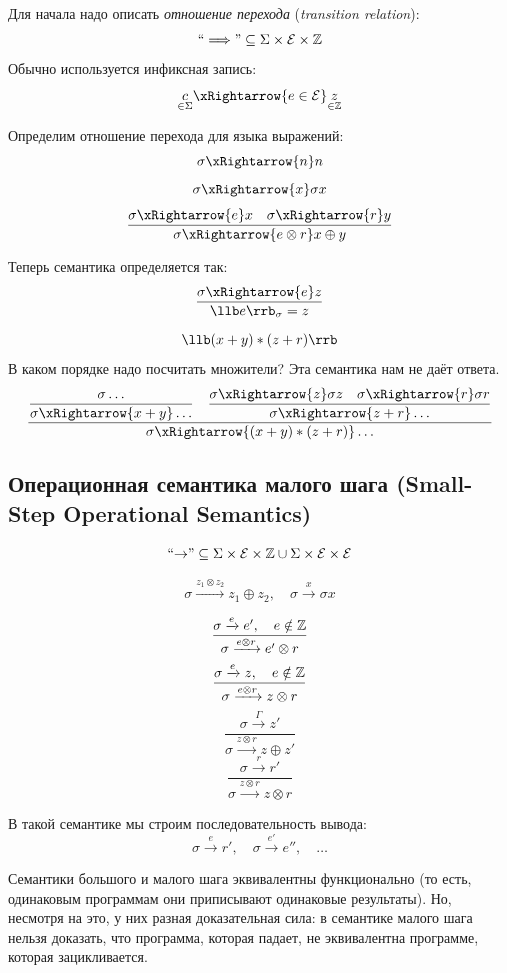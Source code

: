 Для начала надо описать \emph{отношение перехода} (\emph{transition relation}):
$$ \text{``$ \implies $''} \subseteq \Sigma \times \mathcal E \times \mathbb{Z} $$
Обычно используется инфиксная запись:
$$ \underset{\in \Sigma}c \xRightarrow{e \in \mathcal E} \underset{\in \Z}z $$

Определим отношение перехода для языка выражений:
$$ \sigma \xRightarrow{n} n $$
$$ \sigma \xRightarrow{x} \sigma x $$
$$ \frac{\sigma \xRightarrow{e} x \quad \sigma \xRightarrow{r} y}
{\sigma \xRightarrow{e \otimes r} x \oplus y} $$

Теперь семантика определяется так:
$$ \frac{\sigma \xRightarrow{e} z}{\llb e \rrb_\sigma = z} $$

$$ \llb (x + y) * (z + r) \rrb $$
В каком порядке надо посчитать множители?
Эта семантика нам не даёт ответа.
$$ \frac{\dfrac{\sigma \dots}{\sigma \xRightarrow{x + y} \dots} \quad
\dfrac{\sigma \xRightarrow{z} \sigma z \quad \sigma \xRightarrow{r} \sigma r}
{\sigma \xRightarrow{z + r} \dots}}
{\sigma \xRightarrow{(x + y) * (z + r)} \dots} $$

\subsection{Операционная семантика малого шага
(\texorpdfstring{\textenglish{Small-Step Operational Semantics}}{Small-Step Operational Semantics})}

$$ \text{``$ \to $''} \subseteq \Sigma \times \mathcal E \times \mathbb{Z} \cup
\Sigma \times \mathcal E \times \mathcal E $$

$$ \sigma \xrightarrow{z_1 \otimes z_2} z_1 \oplus z_2, \quad \sigma \xrightarrow{x} \sigma x $$

$$ \frac{\sigma \xrightarrow{e} e', \quad e \notin \mathbb{Z}}{\sigma \xrightarrow{e \otimes r}{e' \otimes r}} $$
$$ \frac{\sigma \xrightarrow{e} z, \quad e \notin \mathbb{Z}}{\sigma \xrightarrow{e \otimes r}{z \otimes r}} $$
$$ \frac{\sigma \xrightarrow{\Gamma}{z'}}{\sigma \xrightarrow{z \otimes r} z \oplus z'} $$
$$ \frac{\sigma \xrightarrow{r} r'}{\sigma \xrightarrow{z \otimes r} z \otimes r} $$

В такой семантике мы строим последовательность вывода:
$$ \sigma \xrightarrow{e} r', \quad \sigma \xrightarrow{e'} e'', \quad \dots $$

Семантики большого и малого шага эквивалентны функционально (то есть, одинаковым программам они
приписывают одинаковые результаты).
Но, несмотря на это, у них разная доказательная сила: в семантике малого шага нельзя доказать, что
программа, которая падает, не эквивалентна программе, которая зацикливается.

